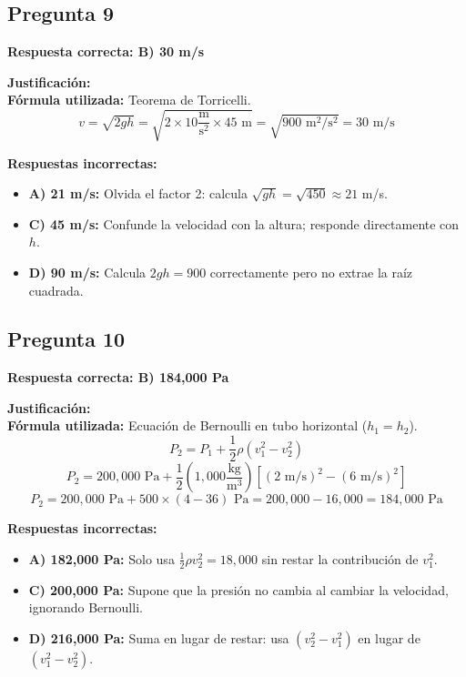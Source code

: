 \begin{respuestabox}
\subsection*{Pregunta 9}
\textcolor{verdecorrecto}{\textbf{Respuesta correcta: B) 30 m/s}}

\textbf{Justificación:}\\
\textbf{Fórmula utilizada:} Teorema de Torricelli.
$$v = \sqrt{2gh} = \sqrt{2 \times 10 \frac{\text{m}}{\text{s}^2} \times 45 \text{ m}} = \sqrt{900 \text{ m}^2/\text{s}^2} = 30 \text{ m/s}$$

\textbf{Respuestas incorrectas:}
\begin{itemize}
    \item \textbf{A) 21 m/s:} Olvida el factor 2: calcula $\sqrt{gh} = \sqrt{450} \approx 21$ m/s.
    \item \textbf{C) 45 m/s:} Confunde la velocidad con la altura; responde directamente con $h$.
    \item \textbf{D) 90 m/s:} Calcula $2gh = 900$ correctamente pero no extrae la raíz cuadrada.
\end{itemize}
\end{respuestabox}

\begin{respuestabox}
\subsection*{Pregunta 10}
\textcolor{verdecorrecto}{\textbf{Respuesta correcta: B) 184{,}000 Pa}}

\textbf{Justificación:}\\
\textbf{Fórmula utilizada:} Ecuación de Bernoulli en tubo horizontal ($h_1 = h_2$).
$$P_2 = P_1 + \frac{1}{2}\rho\left(v_1^2 - v_2^2\right)$$
$$P_2 = 200{,}000 \text{ Pa} + \frac{1}{2}\left(1{,}000 \frac{\text{kg}}{\text{m}^3}\right)\left[(2 \text{ m/s})^2 - (6 \text{ m/s})^2\right]$$
$$P_2 = 200{,}000 \text{ Pa} + 500 \times (4 - 36) \text{ Pa} = 200{,}000 - 16{,}000 = 184{,}000 \text{ Pa}$$

\textbf{Respuestas incorrectas:}
\begin{itemize}
    \item \textbf{A) 182{,}000 Pa:} Solo usa $\tfrac{1}{2}\rho v_2^2 = 18{,}000$ sin restar la contribución de $v_1^2$.
    \item \textbf{C) 200{,}000 Pa:} Supone que la presión no cambia al cambiar la velocidad, ignorando Bernoulli.
    \item \textbf{D) 216{,}000 Pa:} Suma en lugar de restar: usa $(v_2^2 - v_1^2)$ en lugar de $(v_1^2 - v_2^2)$.
\end{itemize}
\end{respuestabox}

